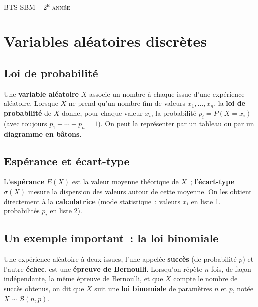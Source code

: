 \documentclass[11pt,a4paper]{article}
\begin{document}
\begin{center}
{\large\textsc{BTS SBM -- 2\textsuperscript{e} année}}\\[2pt]
{\Huge\bfseries{}}
\end{center}
\bigskip

\section{Variables aléatoires discrètes}

\subsection{Loi de probabilité}

\begin{definition}
Une \textbf{variable aléatoire} $X$ associe un nombre à chaque issue d'une expérience aléatoire. Lorsque $X$ ne prend qu'un nombre fini de valeurs $x_1,\dots,x_n$, la \textbf{loi de probabilité} de $X$ donne, pour chaque valeur $x_i$, la probabilité $p_i = P(X=x_i)$ (avec toujours $p_1+\cdots+p_n=1$). On peut la représenter par un tableau ou par un \textbf{diagramme en bâtons}.
\end{definition}

\subsection{Espérance et écart-type}

\begin{definition}
L'\textbf{espérance} $E(X)$ est la valeur moyenne théorique de $X$~; l'\textbf{écart-type} $\sigma(X)$ mesure la dispersion des valeurs autour de cette moyenne. On les obtient directement à la \textbf{calculatrice} (mode statistique~: valeurs $x_i$ en liste 1, probabilités $p_i$ en liste 2).
\end{definition}

\subsection{Un exemple important~: la loi binomiale}

\begin{definition}
Une expérience aléatoire à deux issues, l'une appelée \textbf{succès} (de probabilité $p$) et l'autre \textbf{échec}, est une \textbf{épreuve de Bernoulli}. Lorsqu'on répète $n$ fois, de façon indépendante, la même épreuve de Bernoulli, et que $X$ compte le nombre de succès obtenus, on dit que $X$ suit une \textbf{loi binomiale} de paramètres $n$ et $p$, notée $X \sim \mathcal{B}(n,p)$.
\end{definition}
\end{document}
